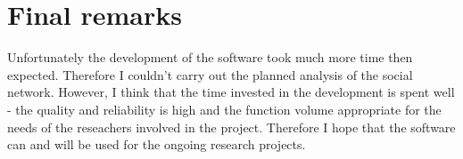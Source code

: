 \section{Final remarks}
\label{sec:final_remarks}

Unfortunately the development of the software took much more time then expected. Therefore I couldn't carry out the planned analysis of the social network. However, I think that the time invested in the development is spent well - the quality and reliability is high and the function volume appropriate for the needs of the reseachers involved in the project. Therefore I hope that the software can and will be used for the ongoing research projects.

